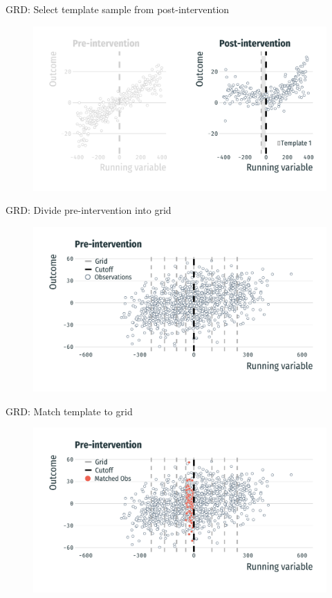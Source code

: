 \documentclass[usenames,dvipsnames,11pt,aspectratio=169]{beamer}
\begin{document}
\begin{frame}{GRD: Select template sample from post-intervention}
\begin{figure}[!htb]
\centering
   \includegraphics[width=\textwidth]{figures/pre_post0b.pdf}
\end{figure}
\end{frame}

\begin{frame}{GRD: Divide pre-intervention into grid}
\begin{figure}[!htb]
   \includegraphics[width=\textwidth]{figures/pre1.pdf}
\end{figure}
\end{frame}

\begin{frame}{GRD: Match template to grid}
\begin{figure}[!htb]
\centering
   \includegraphics[width=\textwidth]{figures/pre2.pdf}
\end{figure}
\end{frame}
\end{document}
